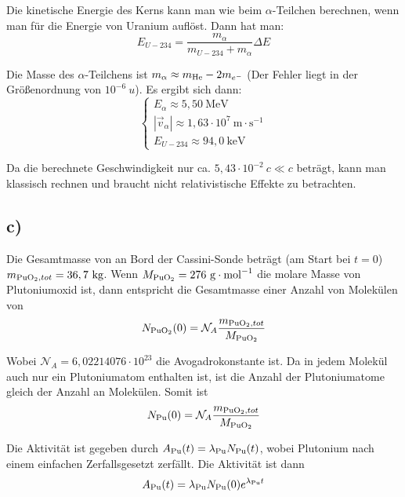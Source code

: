 \documentclass[12pt]{article}
\begin{document}
Die kinetische Energie des Kerns kann man wie beim $\alpha$-Teilchen berechnen, wenn man für die Energie von Uranium auflöst. Dann hat man:
\begin{equation*}
    E_{U-234} = \frac{m_{\alpha}}{m_{U-234} + m_\alpha} \Delta E
\end{equation*}

Die Masse des $\alpha$-Teilchens ist $m_\alpha \approx m_{\ce{He}} - 2m_{e^-}$ (Der Fehler liegt in der Größenordnung von $10^{-6} \ \si{u}$). Es ergibt sich dann:
\begin{equation*}
    \begin{cases}
    E_\alpha \approx 5,50 \ \text{MeV} \\
    |\vec{v}_\alpha| \approx 1,63 \cdot 10^7 \ \text{m} \cdot \text{s}^{-1} \\
    E_{U-234} \approx 94,0 \ \text{keV}
\end{cases}
\end{equation*}


Da die berechnete Geschwindigkeit nur ca. $5,43 \cdot 10^{-2} \ c \ll c$ beträgt, kann man klassisch rechnen und braucht nicht relativistische Effekte zu betrachten. 

\subsection{c)}

Die Gesamtmasse von  an Bord der Cassini-Sonde beträgt (am Start bei $t=0$) $m_{\ce{PuO2},tot} = 36,7 \ \si{kg}$. Wenn $M_{\ce{PuO2}} = 276 \ \si{g} \cdot \si{mol}^{-1}$ die molare Masse von Plutoniumoxid ist, dann entspricht die Gesamtmasse einer Anzahl von Molekülen von
\begin{equation*}
    N_{\ce{PuO2}}(0) = \mathcal{N}_A \frac{m_{\ce{PuO2},tot}}{M_{\ce{PuO2}}}
\end{equation*}

Wobei $\mathcal{N}_A = 6,02214076 \cdot 10^{23} $ die Avogadrokonstante ist. Da in jedem Molekül auch nur ein Plutoniumatom enthalten ist, ist die Anzahl der Plutoniumatome gleich der Anzahl an Molekülen. Somit ist
\begin{equation*}
    N_{\ce{Pu}}(0) = \mathcal{N}_A \frac{m_{\ce{PuO2},tot}}{M_{\ce{PuO2}}}
\end{equation*}

Die Aktivität ist gegeben durch $A_{\ce{Pu}}(t) = \lambda_{\ce{Pu}} N_{\ce{Pu}} (t)$, wobei Plutonium nach einem einfachen Zerfallsgesetzt zerfällt. Die Aktivität ist dann
\begin{equation*}
    A_{\ce{Pu}}(t) = \lambda_{\ce{Pu}} N_{\ce{Pu}}(0) e^{\lambda_{\ce{Pu}}t}
\end{equation*}
\end{document}
